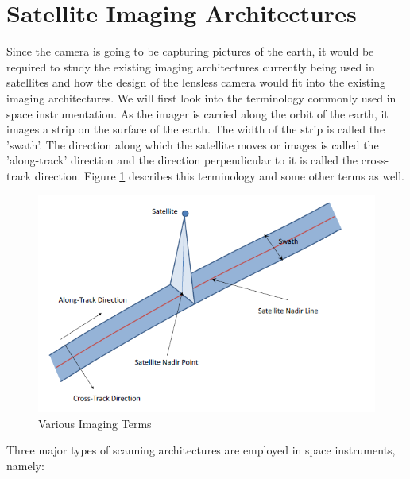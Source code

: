\section{Satellite Imaging Architectures}
Since the camera is going to be capturing pictures of the earth, it would be required to study the existing imaging architectures currently being used in satellites and how the design of the lensless camera would fit into the existing imaging architectures. We will first look into the terminology commonly used in space instrumentation. As the imager is carried along the orbit of the earth, it images a strip on the surface of the earth. The width of the strip is called the 'swath'. The direction along which the satellite moves or images is called the 'along-track' direction and the direction perpendicular to it is called the cross-track direction\cite{ImagingGeo}. Figure \ref{fig:ImagingGeo} describes this terminology and some other terms as well.  
\begin{figure}[ht]
\includegraphics[width=\textwidth]{pics/imaginggeo}
\caption{Various Imaging Terms\cite{ImagingGeo}}
\label{fig:ImagingGeo}
\end{figure}
Three major types of scanning architectures are employed in space instruments, namely:
